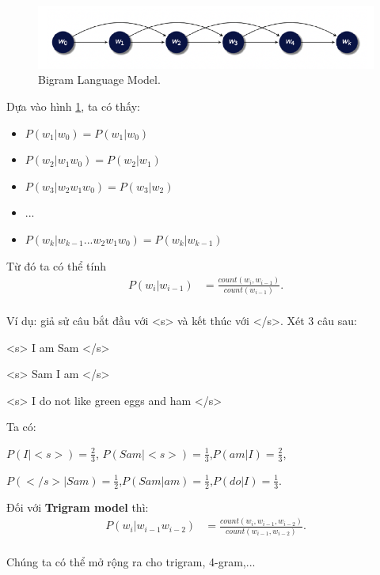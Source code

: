 \begin{figure}[H]
    \centering
    \includegraphics[width=13cm]{chapter07/figure-sec12/bigram.png}
    \caption{Bigram Language Model.}
    \label{fig:bigram}
\end{figure}

Dựa vào hình \ref{fig:bigram}, ta có thấy:
\begin{itemize}
    \item $P(w_1|w_0)=P(w_1|w_0)$
    \item $P(w_2|w_1w_0)=P(w_2|w_1)$
    \item $P(w_3|w_2w_1w_0)=P(w_3|w_2)$
    \item ...
    \item $P(w_k|w_{k-1}...w_2w_1w_0)=P(w_k|w_{k-1})$
\end{itemize}

Từ đó ta có thể tính 
\begin{equation}
\begin{split}
P(w_i|w_{i-1})&=\frac{count(w_i,w_{i-1})}{count(w_{i-1})}.\\
\end{split}
\end{equation}

Ví dụ: giả sử câu bắt đầu với <s> và kết thúc với </s>. Xét 3 câu sau:

<s> I am Sam </s>

<s> Sam I am </s>

<s> I do not like green eggs and ham </s>

Ta có:

$P(I|<s>)=\frac{2}{3}$, $P(Sam|<s>)=\frac{1}{3}$,$P(am|I)=\frac{2}{3}$, 

$P(</s>|Sam)=\frac{1}{2}$,$P(Sam|am)=\frac{1}{2}$,$P(do|I)=\frac{1}{3}$.

Đối với \textbf{Trigram model} thì: 
\begin{equation}
\begin{split}
P(w_i|w_{i-1}w_{i-2})&=\frac{count(w_i,w_{i-1},w_{i-2})}{count(w_{i-1},w_{i-2})}.\\
\end{split}
\end{equation}

Chúng ta có thể mở rộng ra cho trigram, 4-gram,... 

